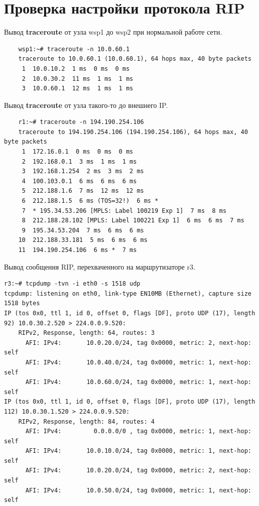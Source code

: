 \documentclass[a4paper,12pt]{article}
\begin{document}
\section{Проверка настройки протокола RIP}

Вывод \textbf{traceroute} от узла wsp1 до wsp2 при нормальной работе сети.

\begin{Verbatim}
    wsp1:~# traceroute -n 10.0.60.1
    traceroute to 10.0.60.1 (10.0.60.1), 64 hops max, 40 byte packets
     1  10.0.10.2  1 ms  0 ms  0 ms
     2  10.0.30.2  11 ms  1 ms  1 ms
     3  10.0.60.1  12 ms  1 ms  1 ms
\end{Verbatim}

Вывод \textbf{traceroute} от узла такого-то до внешнего IP.

\begin{Verbatim}
    r1:~# traceroute -n 194.190.254.106
    traceroute to 194.190.254.106 (194.190.254.106), 64 hops max, 40 byte packets
     1  172.16.0.1  0 ms  0 ms  0 ms
     2  192.168.0.1  3 ms  1 ms  1 ms
     3  192.168.1.254  2 ms  3 ms  2 ms
     4  100.103.0.1  6 ms  6 ms  6 ms
     5  212.188.1.6  7 ms  12 ms  12 ms
     6  212.188.1.5  6 ms (TOS=32!)  6 ms *
     7  * 195.34.53.206 [MPLS: Label 100219 Exp 1]  7 ms  8 ms
     8  212.188.28.102 [MPLS: Label 100221 Exp 1]  6 ms  6 ms  7 ms
     9  195.34.53.204  7 ms  6 ms  6 ms
    10  212.188.33.181  5 ms  6 ms  6 ms
    11  194.190.254.106  6 ms *  7 ms    
\end{Verbatim}

Вывод сообщения RIP, перехваченного на маршрутизаторе r3.

\begin{Verbatim}
r3:~# tcpdump -tvn -i eth0 -s 1518 udp
tcpdump: listening on eth0, link-type EN10MB (Ethernet), capture size 1518 bytes
IP (tos 0x0, ttl 1, id 0, offset 0, flags [DF], proto UDP (17), length 92) 10.0.30.2.520 > 224.0.0.9.520: 
	RIPv2, Response, length: 64, routes: 3
	  AFI: IPv4:       10.0.20.0/24, tag 0x0000, metric: 2, next-hop: self
	  AFI: IPv4:       10.0.40.0/24, tag 0x0000, metric: 1, next-hop: self
	  AFI: IPv4:       10.0.60.0/24, tag 0x0000, metric: 1, next-hop: self
IP (tos 0x0, ttl 1, id 0, offset 0, flags [DF], proto UDP (17), length 112) 10.0.30.1.520 > 224.0.0.9.520: 
	RIPv2, Response, length: 84, routes: 4
	  AFI: IPv4:         0.0.0.0/0 , tag 0x0000, metric: 1, next-hop: self
	  AFI: IPv4:       10.0.10.0/24, tag 0x0000, metric: 1, next-hop: self
	  AFI: IPv4:       10.0.20.0/24, tag 0x0000, metric: 2, next-hop: self
	  AFI: IPv4:       10.0.50.0/24, tag 0x0000, metric: 1, next-hop: self
\end{Verbatim}
\end{document}
